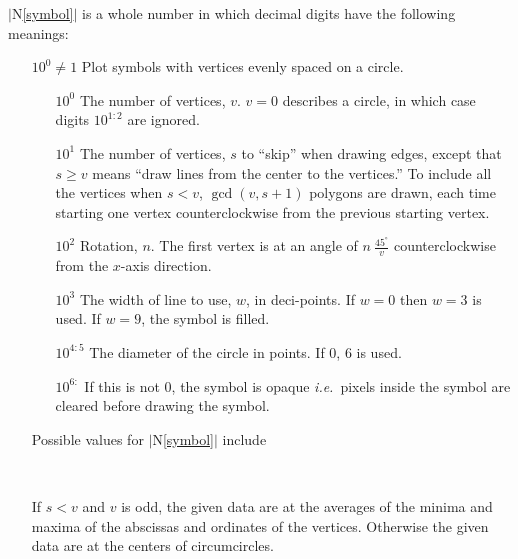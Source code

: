 \documentclass[twoside]{MATH77}
\begin{document}
\begin{multicols}{2}
\begin{enumerate}
        $|$N\ref{symbol}$|$ is a whole number in which decimal digits
        have the following meanings:
        \begin{itemize}
        \item[$10^0\neq 1$] Plot symbols with vertices evenly spaced on a
        circle.
        \begin{itemize}
        \item[$10^0$] The number of vertices, $v$. $v=0$ describes a
          circle, in which case digits $10^{1:2}$ are ignored.
        \item[$10^1$] The number of vertices, $s$ to ``skip'' when drawing
          edges, except that $s \geq v$ means ``draw lines from the center
          to the vertices.''  To include all the vertices when $s<v$,
          $\gcd(v,s+1)$ polygons are drawn, each time starting one vertex
          counterclockwise from the previous starting vertex.
        \item[$10^2$]  Rotation, $n$.  The first vertex is at an angle of
          $n \: \frac{45^\circ}v$ counterclockwise from the $x$-axis
          direction.
        \item[$10^3$] The width of line to use, $w$, in deci-points.
         If $w=0$ then $w = 3$ is used.  If $w=9$, the symbol is filled.
        \item[$10^{4:5}$] The diameter of the circle in points.  If 0, 6
        is used.
        \item[$10^{6:}$] If this is not 0, the symbol is opaque {\em
        i.e.}\ pixels inside the symbol are cleared before drawing the
        symbol.
 \end{itemize}
        Possible values for $|$N\ref{symbol}$|$ include\vspace{5pt}
\begin{center}
\mbox{ }
\end{center}

        If $s < v$ and $v$ is odd, the given data are at the averages of
        the minima and maxima of the abscissas and ordinates of the
        vertices.  Otherwise the given data are at the centers of
        circumcircles.


\end{itemize}
\end{enumerate}
\end{multicols}
\end{document}
